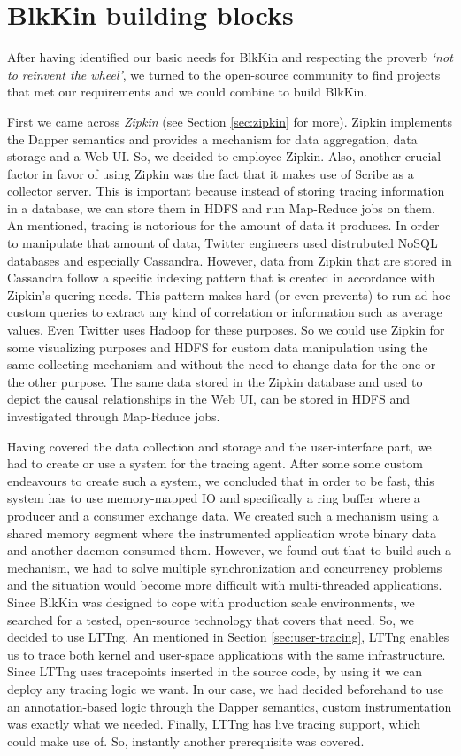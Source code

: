 \section{BlkKin building blocks}\label{sec:components}

After having identified our basic needs for BlkKin and respecting the proverb
\textit{`not to reinvent the wheel'}, we turned to the open-source community to
find projects that met our requirements and we could combine to build BlkKin.

First we came across \textit{Zipkin} (see Section \ref{sec:zipkin} for more).
Zipkin implements the Dapper semantics and provides a mechanism for data
aggregation, data storage and a Web UI. So, we decided to employee Zipkin. Also,
another crucial factor in favor of using Zipkin was the fact that it makes use
of Scribe as a collector server. This is important because instead of storing
tracing information in a database, we can store them in HDFS and run Map-Reduce
jobs on them. An mentioned, tracing is notorious for the amount of data it
produces. In order to manipulate that amount of data, Twitter engineers used
distrubuted NoSQL databases and especially Cassandra. However, data from Zipkin
that are stored in Cassandra follow a specific indexing pattern that is created
in accordance with Zipkin's quering needs. This pattern makes hard (or even
prevents) to run ad-hoc custom queries to extract any kind of correlation or
information such as average values. Even Twitter uses Hadoop for these purposes.
So we could use Zipkin for some visualizing purposes and HDFS for custom data
manipulation using the same collecting mechanism and without the need to change
data for the one or the other purpose. The same data stored in the Zipkin
database and used to depict the causal relationships in the Web UI, can be
stored in HDFS and investigated through Map-Reduce jobs.  

Having covered the data collection and storage and the user-interface part, we
had to create or use a system for the tracing agent. After some some custom
endeavours to create such a system, we concluded that in order to be fast, this
system has to use memory-mapped IO and specifically a ring buffer where a
producer and a consumer exchange data. We created such a mechanism using a
shared memory segment where the instrumented application wrote binary data and
another daemon consumed them. However, we found out that to build such a
mechanism, we had to solve multiple synchronization and concurrency problems and
the situation would become more difficult with multi-threaded applications.
Since BlkKin was designed to cope with production scale environments, we
searched for a tested, open-source technology that covers that need. So, we
decided to use LTTng. An mentioned in Section \ref{sec:user-tracing}, LTTng
enables us to trace both kernel and user-space applications with the same
infrastructure. Since LTTng uses tracepoints inserted in the source code, by
using it we can deploy any tracing logic we want. In our case, we had decided
beforehand to use an annotation-based logic through the Dapper semantics, custom
instrumentation was exactly what we needed. Finally, LTTng has live tracing
support, which could make use of. So, instantly another prerequisite was
covered.

